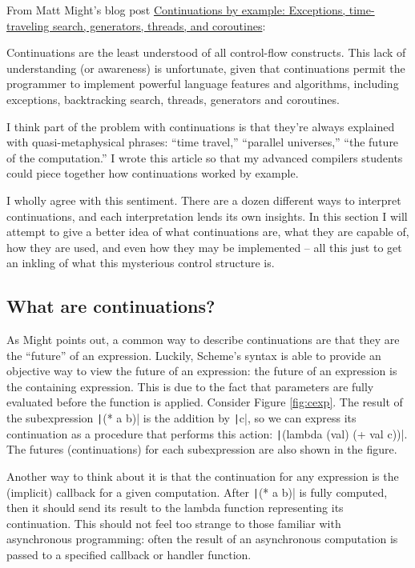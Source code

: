 \documentclass[]{article}
\begin{document}
From Matt Might's blog post \href{https://matt.might.net/articles/programming-with-continuations--exceptions-backtracking-search-threads-generators-coroutines/}{Continuations by example: Exceptions, time-traveling search, generators, threads, and coroutines}:

\begin{displayquote}
  Continuations are the least understood of all control-flow constructs. This lack of understanding (or awareness) is unfortunate, given that continuations permit the programmer to implement powerful language features and algorithms, including exceptions, backtracking search, threads, generators and coroutines.

  I think part of the problem with continuations is that they're always explained with quasi-metaphysical phrases: ``time travel,'' ``parallel universes,'' ``the future of the computation.'' I wrote this article so that my advanced compilers students could piece together how continuations worked by example.
\end{displayquote}

I wholly agree with this sentiment. There are a dozen different ways to interpret continuations, and each interpretation lends its own insights. In this section I will attempt to give a better idea of what continuations are, what they are capable of, how they are used, and even how they may be implemented -- all this just to get an inkling of what this mysterious control structure is.

\subsection{What are continuations?}
\label{sec:what}

As Might points out, a common way to describe continuations are that they are the ``future'' of an expression. Luckily, Scheme's syntax is able to provide an objective way to view the future of an expression: the future of an expression is the containing expression. This is due to the fact that parameters are fully evaluated before the function is applied. Consider Figure \ref{fig:cexp}. The result of the subexpression \texttt|(* a b)| is the addition by \texttt|c|, so we can express its continuation as a procedure that performs this action: \texttt|(lambda (val) (+ val c))|. The futures (continuations) for each subexpression are also shown in the figure.

Another way to think about it is that the continuation for any expression is the (implicit) callback for a given computation. After \texttt|(* a b)| is fully computed, then it should send its result to the lambda function representing its continuation. This should not feel too strange to those familiar with asynchronous programming: often the result of an asynchronous computation is passed to a specified callback or handler function.
\end{document}
